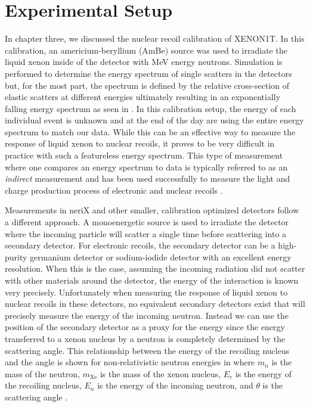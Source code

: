 \section{Experimental Setup}
\label{sec:nerix_expt_setup}

In chapter three, we discussed the nuclear recoil calibration of XENON1T.  In this calibration, an americium-beryllium (AmBe) source was used to irradiate the liquid xenon inside of the detector with MeV energy neutrons.  Simulation is performed to determine the energy spectrum of single scatters in the detectors but, for the most part, the spectrum is defined by the relative cross-section of elastic scatters at different energies ultimately resulting in an exponentially falling energy spectrum as seen in .  In this calibration setup, the energy of each individual event is unknown and at the end of the day are using the entire energy spectrum to match our data.  While this can be an effective way to measure the response of liquid xenon to nuclear recoils, it proves to be very difficult in practice with such a featureless energy spectrum.  This type of measurement where one compares an energy spectrum to data is typically referred to as an \textit{indirect} measurement and has been used successfully to measure the light and charge production process of electronic and nuclear recoils \cite{aprile2013response, akerib2016tritium, aprile2017tritium}.

Measurements in neriX and other smaller, calibration optimized detectors follow a different approach.  A monoenergetic source is used to irradiate the detector where the incoming particle will scatter a single time before scattering into a secondary detector.  For electronic recoils, the secondary detector can be a high-purity germanium detector or sodium-iodide detector with an excellent energy resolution.  When this is the case, assuming the incoming radiation did not scatter with other materials around the detector, the energy of the interaction is known very precisely.  Unfortunately when measuring the response of liquid xenon to nuclear recoils in these detectors, no equivalent secondary detectors exist that will precisely measure the energy of the incoming neutron.  Instead we can use the position of the secondary detector as a proxy for the energy since the energy transferred to a xenon nucleus by a neutron is completely determined by the scattering angle.  This relationship between the energy of the recoiling nucleus and the angle is shown for non-relativistic neutron energies in  where $m_n$ is the mass of the neutron, $m_{\textrm{Xe}}$ is the mass of the xenon nucleus, $E_r$ is the energy of the recoiling nucleus, $E_n$ is the energy of the incoming neutron, and $\theta$ is the scattering angle \cite{knoll2010radiation}.

